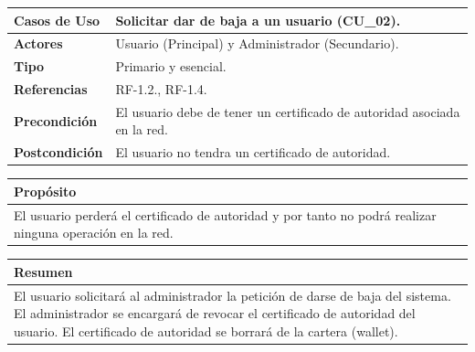 \begin{itemize}
    \begin{table}[h!]
        \centering
        \begin{tabular}{|l|p{}|}
            \hline
            \textbf{Casos de Uso}   &   Solicitar dar de baja a un usuario (CU\_02). \\
            \hline 
            \textbf{Actores}        &   Usuario (Principal) y Administrador (Secundario). \\ 
            \hline 
            \textbf{Tipo}           &   Primario y esencial. \\
            \hline
            \textbf{Referencias}    &   RF-1.2., RF-1.4.\\ 
            \hline
            \textbf{Precondición}   &   El usuario debe de tener un certificado de autoridad asociada en la red.\\ 
            \hline
            \textbf{Postcondición}  &   El usuario no tendra un certificado de autoridad.\\ 
            \hline
        \end{tabular}
        
        \vspace{5mm}
        
        \begin{tabular}{|p{\textwidth}|}
            \hline
            \rowcolor{SeaGreen} \textbf{Propósito} \\
            \hline
            \multicolumn{1}{|p{12cm}|}{El usuario perderá el certificado de autoridad y por tanto no podrá realizar
            ninguna operación en la red.} \\ [0.5ex]
            \hline
        \end{tabular}
        
        \vspace{5mm}
        
        \begin{tabular}{|p{\textwidth}|}
            \hline
            \rowcolor{SeaGreen} \textbf{Resumen} \\
            \hline
            \multicolumn{1}{|p{12cm}|}{El usuario solicitará al administrador la petición de darse de baja del sistema. El administrador
            se encargará de revocar el certificado de autoridad del usuario. El certificado de autoridad se borrará de la cartera (wallet).} \\ [0.5ex]
            \hline
        \end{tabular}
        

\end{table}
\end{itemize}
